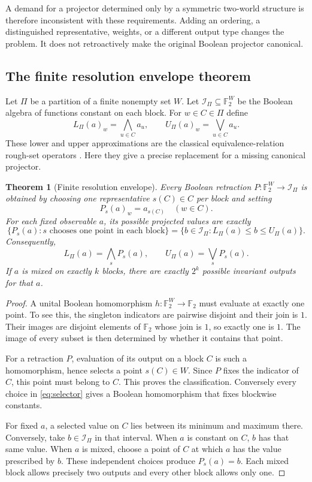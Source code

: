 \documentclass[11pt,letterpaper]{article}
\newtheorem{theorem}{Theorem}[section]
\theoremstyle{definition}
\newcommand{\F}{\mathbb F_2}
\newcommand{\Inv}{\mathcal I}
\begin{document}
A demand for a projector determined only by a symmetric two-world structure is therefore inconsistent with these requirements. Adding an ordering, a distinguished representative, weights, or a different output type changes the problem. It does not retroactively make the original Boolean projector canonical.

\subsection{The finite resolution envelope theorem}
Let $\Pi$ be a partition of a finite nonempty set $W$. Let $\Inv_\Pi\subseteq\F^W$ be the Boolean algebra of functions constant on each block. For $w\in C\in\Pi$ define
\[
L_\Pi(a)_w=\bigwedge_{u\in C}a_u,\qquad
U_\Pi(a)_w=\bigvee_{u\in C}a_u.
\]
These lower and upper approximations are the classical equivalence-relation rough-set operators \cite{pawlak}. Here they give a precise replacement for a missing canonical projector.

\begin{theorem}[Finite resolution envelope]\label{thm:envelope}
Every Boolean retraction $P:\F^W\to\Inv_\Pi$ is obtained by choosing one representative $s(C)\in C$ per block and setting
\begin{equation}\label{eq:selector}
P_s(a)_w=a_{s(C)}\quad(w\in C).
\end{equation}
For each fixed observable $a$, its possible projected values are exactly
\begin{equation}\label{eq:envelope}
\{P_s(a):s\text{ chooses one point in each block}\}
=\{b\in\Inv_\Pi:L_\Pi(a)\leq b\leq U_\Pi(a)\}.
\end{equation}
Consequently,
\[
L_\Pi(a)=\bigwedge_sP_s(a),\qquad
U_\Pi(a)=\bigvee_sP_s(a).
\]
If $a$ is mixed on exactly $k$ blocks, there are exactly $2^k$ possible invariant outputs for that $a$.
\end{theorem}
\begin{proof}
A unital Boolean homomorphism $h:\F^W\to\F$ must evaluate at exactly one point. To see this, the singleton indicators are pairwise disjoint and their join is $1$. Their images are disjoint elements of $\F$ whose join is $1$, so exactly one is $1$. The image of every subset is then determined by whether it contains that point.

For a retraction $P$, evaluation of its output on a block $C$ is such a homomorphism, hence selects a point $s(C)\in W$. Since $P$ fixes the indicator of $C$, this point must belong to $C$. This proves the classification. Conversely every choice in \eqref{eq:selector} gives a Boolean homomorphism that fixes blockwise constants.

For fixed $a$, a selected value on $C$ lies between its minimum and maximum there. Conversely, take $b\in\Inv_\Pi$ in that interval. When $a$ is constant on $C$, $b$ has that same value. When $a$ is mixed, choose a point of $C$ at which $a$ has the value prescribed by $b$. These independent choices produce $P_s(a)=b$. Each mixed block allows precisely two outputs and every other block allows only one.
\end{proof}
\end{document}

